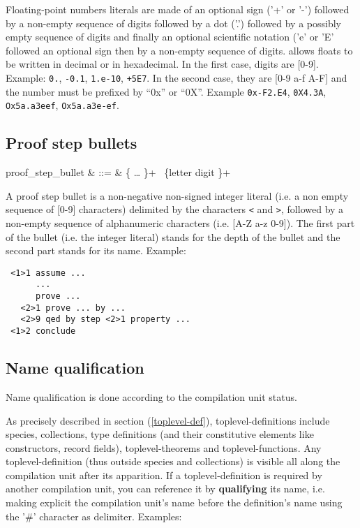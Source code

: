 Floating-point numbers literals are made of an optional sign ('+' or
'-') followed by a non-empty sequence of digits followed by a dot
('.') followed by a possibly empty sequence of digits and finally an
optional scientific notation ('e' or 'E' followed an optional sign
then by a non-empty sequence of digits. {\focal} allows floats to be
written in decimal or in hexadecimal. In the first case, digits are
[0-9]. Example: {\tt 0.}, {\tt -0.1}, {\tt 1.e-10}, {\tt +5E7}.
In the second case, they are [0-9 a-f A-F] and the number must be
prefixed by ``0x'' or ``0X''. Example {\tt 0x-F2.E4}, {\tt 0X4.3A},
{\tt Ox5a.a3eef}, {\tt Ox5a.a3e-ef}.

\subsection{Proof step bullets}
\begin{syntax}
proof\_step\_bullet & ::= &
   \terminal{<} \{  \ldots {} \}+ \terminal{>}
   \ \{letter \mid digit \}+
\end{syntax}

A proof step bullet is a non-negative non-signed integer literal
(i.e. a non empty sequence of [0-9] characters) delimited by the
characters {\tt <} and {\tt >}, followed by a non-empty sequence of
alphanumeric characters (i.e. [A-Z a-z 0-9]).
The first part of the bullet (i.e. the integer literal) stands for the
depth of the bullet and the second part stands for its name. Example:
{\scriptsize
\begin{lstlisting}
 <1>1 assume ...
      ...
      prove ...
   <2>1 prove ... by ...
   <2>9 qed by step <2>1 property ...
 <1>2 conclude
\end{lstlisting}
}

\subsection{Name qualification}
\label{qualified-name}
 

Name qualification is done according to the
compilation unit status.

As precisely described in section (\ref{toplevel-def}),
toplevel-definitions include species, collections, type definitions
(and their constitutive elements like constructors, record fields),
toplevel-theorems and toplevel-functions.  Any toplevel-definition (thus outside species
and collections) is visible all along the compilation unit after its
apparition.
If a toplevel-definition is required by another compilation unit, you can
reference it by {\bf qualifying} its name, i.e. making explicit the
compilation unit's name before the definition's name using the '\#'
character as delimiter. Examples:

